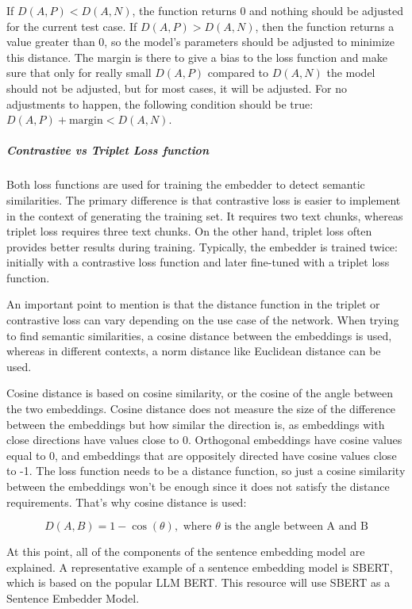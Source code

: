 \documentclass[11pt]{wseas}
\begin{document}
If \(D(A,P) < D(A,N)\), the function returns 0 and nothing should be
adjusted for the current test case. If \(D(A,P) > D(A,N)\), then the
function returns a value greater than 0, so the model's parameters
should be adjusted to minimize this distance. The margin is there to
give a bias to the loss function and make sure that only for really
small \(D(A,P)\) compared to \(D(A,N)\) the model should not be
adjusted, but for most cases, it will be adjusted. For no adjustments to
happen, the following condition should be true:
\(D(A,P) + \text{margin} < D(A,N)\).

\subparagraph{Contrastive vs Triplet Loss
function}\label{contrastive-vs-triplet-loss-function}

Both loss functions are used for training the embedder to detect
semantic similarities. The primary difference is that contrastive loss
is easier to implement in the context of generating the training set. It
requires two text chunks, whereas triplet loss requires three text
chunks. On the other hand, triplet loss often provides better results
during training. Typically, the embedder is trained twice: initially
with a contrastive loss function and later fine-tuned with a triplet
loss function.

An important point to mention is that the distance function in the
triplet or contrastive loss can vary depending on the use case of the
network. When trying to find semantic similarities, a cosine distance
between the embeddings is used, whereas in different contexts, a norm
distance like Euclidean distance can be used.

Cosine distance is based on cosine similarity, or the cosine of the
angle between the two embeddings. Cosine distance does not measure the
size of the difference between the embeddings but how similar the
direction is, as embeddings with close directions have values close to
0. Orthogonal embeddings have cosine values equal to 0, and embeddings
that are oppositely directed have cosine values close to -1. The loss
function needs to be a distance function, so just a cosine similarity
between the embeddings won't be enough since it does not satisfy the
distance requirements. That's why cosine distance is used:

\[
D(A, B) = 1 - \cos(\theta), \text{ where } \theta \text{ is the angle between A and B}
\]

At this point, all of the components of the sentence embedding model are
explained. A representative example of a sentence embedding model is
SBERT, which is based on the popular LLM BERT. This resource will use
SBERT as a Sentence Embedder Model.
\end{document}
